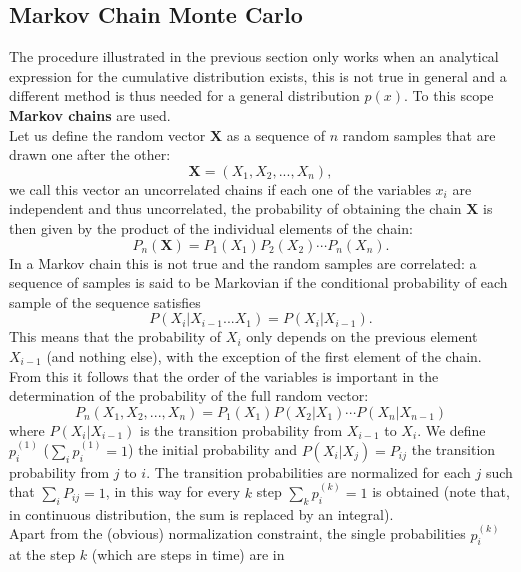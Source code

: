 \subsection{Markov Chain Monte Carlo}
The procedure illustrated in the previous section only works when an analytical expression for the cumulative distribution exists, 
this is not true in general and a different method is thus needed for a general distribution $p(x)$. To this scope \textbf{Markov chains} are 
used.\\
Let us define the random vector $\mathbf{X}$ as a sequence of $n$ random samples that are drawn one after the other:
\begin{equation}
    \mathbf{X}=\left(X_1,X_2,...,X_n\right),
\end{equation}
we call this vector an uncorrelated chains if each one of the variables $x_i$ are independent and thus uncorrelated, the probability of 
obtaining the chain $\mathbf{X}$ is then given by the product of the individual elements of the chain:
\begin{equation}
    P_n(\mathbf{X})=P_1(X_1)P_2(X_2)\cdots P_n(X_n).
\end{equation}
In a Markov chain this is not true and the random samples are correlated: a sequence of samples is said to be Markovian if the conditional 
probability of each sample of the sequence satisfies
\begin{equation}
    P(X_i|X_{i-1}...X_1)=P(X_i|X_{i-1}).
\end{equation}
This means that the probability of $X_i$ only depends on the previous element $X_{i-1}$ (and nothing else), with the exception of the first 
element of the chain. From this it follows that the order of the variables is important in the determination of the probability 
of the full random vector:
\begin{equation}
    P_n(X_1,X_2,...,X_n)=P_1(X_1)P(X_2|X_1)\cdots P(X_n|X_{n-1})
\end{equation}
where $P(X_i|X_{i-1})$ is the transition probability from $X_{i-1}$ to $X_i$.
We define $p_i^{(1)}$ ($\sum_i p_i^{(1)}=1$) the initial probability and $P(X_i|X_j)=P_{ij}$ the transition probability from $j$ to $i$. The transition 
probabilities are normalized for each $j$ such that $\sum_i P_{ij}=1$, in this way for every $k$ step $\sum_k p_i^{(k)}=1$ is obtained (note that, in continuous 
distribution, the sum is replaced by an integral).\\
Apart from the (obvious) normalization constraint, the single probabilities $p_i^{(k)}$ at the step $k$ (which are steps in time) are in 

